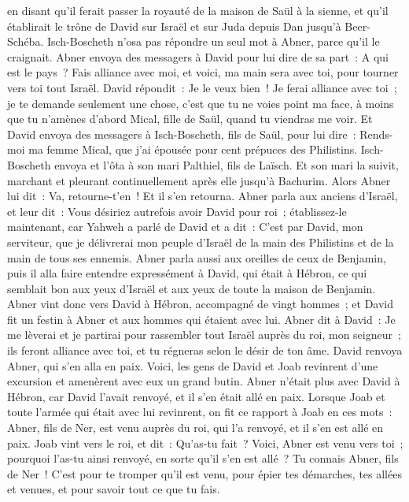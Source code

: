 \begin{multicols}{2}
en disant qu'il ferait passer la royauté de la maison de Saül à la sienne, et qu'il établirait le trône de David sur Israël et sur Juda depuis Dan jusqu'à Beer-Schéba.
Isch-Boscheth n'osa pas répondre un seul mot à Abner, parce qu'il le craignait.
Abner envoya des messagers à David pour lui dire de sa part~: A qui est le pays~? Fais alliance avec moi, et voici, ma main sera avec toi, pour tourner vers toi tout Israël.
David répondit~: Je le veux bien~! Je ferai alliance avec toi~; je te demande seulement une chose, c'est que tu ne voies point ma face, à moins que tu n'amènes d'abord Mical, fille de Saül, quand tu viendras me voir.
Et David envoya des messagers à Isch-Boscheth, fils de Saül, pour lui dire~: Rends-moi ma femme Mical, que j'ai épousée pour cent prépuces des Philistins.
Isch-Boscheth envoya et l'ôta à son mari Palthiel, fils de Laïsch.
Et son mari la suivit, marchant et pleurant continuellement après elle jusqu'à Bachurim. Alors Abner lui dit~: Va, retourne-t'en~! Et il s'en retourna.
Abner parla aux anciens d'Israël, et leur dit~: Vous désiriez autrefois avoir David pour roi~;
établissez-le maintenant, car Yahweh a parlé de David et a dit~: C'est par David, mon serviteur, que je délivrerai mon peuple d'Israël de la main des Philistins et de la main de tous ses ennemis.
Abner parla aussi aux oreilles de ceux de Benjamin, puis il alla faire entendre expressément à David, qui était à Hébron, ce qui semblait bon aux yeux d'Israël et aux yeux de toute la maison de Benjamin.
Abner vint donc vers David à Hébron, accompagné de vingt hommes~; et David fit un festin à Abner et aux hommes qui étaient avec lui.
Abner dit à David~: Je me lèverai et je partirai pour rassembler tout Israël auprès du roi, mon seigneur~; ils feront alliance avec toi, et tu régneras selon le désir de ton âme. David renvoya Abner, qui s'en alla en paix.
Voici, les gens de David et Joab revinrent d'une excursion et amenèrent avec eux un grand butin. Abner n'était plus avec David à Hébron, car David l'avait renvoyé, et il s'en était allé en paix.
Lorsque Joab et toute l'armée qui était avec lui revinrent, on fit ce rapport à Joab en ces mots~: Abner, fils de Ner, est venu auprès du roi, qui l'a renvoyé, et il s'en est allé en paix.
Joab vint vers le roi, et dit~: Qu'as-tu fait~? Voici, Abner est venu vers toi~; pourquoi l'as-tu ainsi renvoyé, en sorte qu'il s'en est allé~?
Tu connais Abner, fils de Ner~! C'est pour te tromper qu'il est venu, pour épier tes démarches, tes allées et venues, et pour savoir tout ce que tu fais.

\end{multicols}
